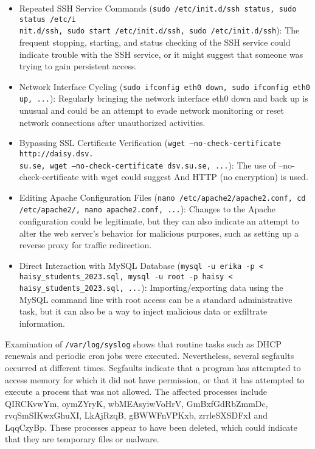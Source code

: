 \begin{itemize}
	\item Repeated SSH Service Commands (\texttt{sudo /etc/init.d/ssh status, sudo status  /etc/i\\nit.d/ssh, sudo start  /etc/init.d/ssh, sudo  /etc/init.d/ssh}): The frequent stopping, starting, and status checking of the SSH service could indicate trouble with the SSH service, or it might suggest that someone was trying to gain persistent access.
	\item Network Interface Cycling (\texttt{sudo ifconfig eth0 down, sudo ifconfig eth0 up, ...}): Regularly bringing the network interface eth0 down and back up is unusual and could be an attempt to evade network monitoring or reset network connections after unauthorized activities.
	\item Bypassing SSL Certificate Verification (\texttt{wget --no-check-certificate http://daisy.dsv.\\su.se, wget --no-check-certificate dsv.su.se, ...}): The use of --no-check-certificate with wget could suggest And HTTP (no encryption) is used.
	\item Editing Apache Configuration Files (\texttt{nano /etc/apache2/apache2.conf, cd /etc/apache2/, nano apache2.conf, ...}): Changes to the Apache configuration could be legitimate, but they can also indicate an attempt to alter the web server's behavior for malicious purposes, such as setting up a reverse proxy for traffic redirection.
	\item Direct Interaction with MySQL Database (\texttt{mysql -u erika -p < haisy\_students\_2023.sql, mysql -u root -p haisy < haisy\_students\_2023.sql, ...}): Importing/exporting data using the MySQL command line with root access can be a standard administrative task, but it can also be a way to inject malicious data or exfiltrate information.
\end{itemize}
Examination of \texttt{/var/log/syslog} shows that routine tasks such as DHCP renewals and periodic cron jobs were executed. Nevertheless, several segfaults occurred at different times. Segfaults indicate that a program has attempted to access memory for which it did not have permission, or that it has attempted to execute a process that was not allowed. The affected processes include QIRCKvwYm, oymZYryK, wbMEAsyiwVoHrV, GmBxfGdRbZmmDc, rvqSmSIKwxGhuXI, LkAjRzqB, gBWWFnVPKxb, zrrleSXSDFxI and LqqCzyBp. These processes appear to have been deleted, which could indicate that they are temporary files or malware.
\newline

